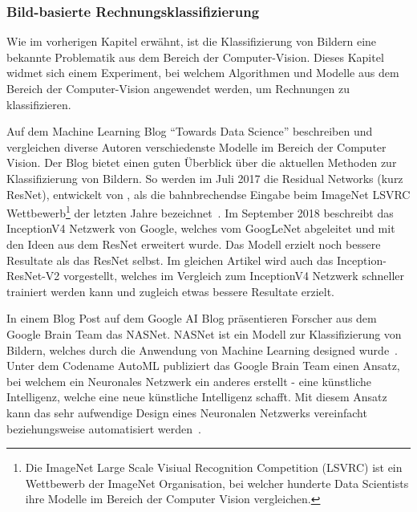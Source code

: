 \subsubsection{Bild-basierte Rechnungsklassifizierung}
\label{chap:image-recon}


Wie im vorherigen Kapitel erwähnt, ist die Klassifizierung von Bildern eine bekannte Problematik aus dem Bereich der Computer-Vision. Dieses Kapitel widmet sich einem Experiment, bei welchem Algorithmen und Modelle aus dem Bereich der Computer-Vision angewendet werden, um Rechnungen zu klassifizieren.

Auf dem Machine Learning Blog \enquote{Towards Data Science} beschreiben und vergleichen diverse Autoren verschiedenste Modelle im Bereich der Computer Vision. Der Blog bietet einen guten Überblick über die aktuellen Methoden zur Klassifizierung von Bildern. So werden im Juli 2017 die Residual Networks (kurz ResNet), entwickelt von \textcite{He2015}, als die bahnbrechendse Eingabe beim ImageNet LSVRC Wettbewerb\footnote{Die ImageNet Large Scale Visiual Recognition Competition (LSVRC) ist ein Wettbewerb der ImageNet Organisation, bei welcher hunderte Data Scientists ihre Modelle im Bereich der Computer Vision vergleichen.} der letzten Jahre bezeichnet~\autocite{Fungg2017ResNet}. Im September 2018 beschreibt \textcite{SHTsuang2018Inception} das InceptionV4 Netzwerk von Google, welches vom GoogLeNet abgeleitet und mit den Ideen aus dem ResNet erweitert wurde. Das Modell erzielt noch bessere Resultate als das ResNet selbst. Im gleichen Artikel wird auch das Inception-ResNet-V2 vorgestellt, welches im Vergleich zum InceptionV4 Netzwerk schneller trainiert werden kann und zugleich etwas bessere Resultate erzielt. 

In einem Blog Post auf dem Google AI Blog präsentieren Forscher aus dem Google Brain Team das NASNet. NASNet ist ein Modell zur Klassifizierung von Bildern, welches durch die Anwendung von Machine Learning designed wurde~\autocite{GoogleNasNet}. Unter dem Codename AutoML publiziert das Google Brain Team einen Ansatz, bei welchem ein Neuronales Netzwerk ein anderes erstellt - eine künstliche Intelligenz, welche eine neue künstliche Intelligenz schafft. Mit diesem Ansatz kann das sehr aufwendige Design eines Neuronalen Netzwerks vereinfacht beziehungsweise automatisiert werden~\autocite{GoogleAutoML}.



